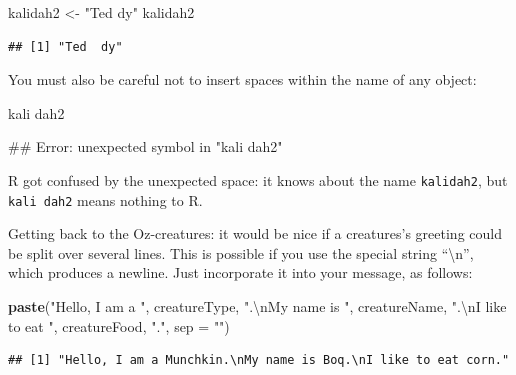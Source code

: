 \documentclass[]{book}
\makeatletter
\newenvironment{Shaded}{\begin{snugshade}}{\end{snugshade}}
\newcommand{\KeywordTok}[1]{\textcolor[rgb]{0.13,0.29,0.53}{\textbf{#1}}}
\newcommand{\DataTypeTok}[1]{\textcolor[rgb]{0.13,0.29,0.53}{#1}}
\newcommand{\CharTok}[1]{\textcolor[rgb]{0.31,0.60,0.02}{#1}}
\newcommand{\StringTok}[1]{\textcolor[rgb]{0.31,0.60,0.02}{#1}}
\newcommand{\NormalTok}[1]{#1}
\newenvironment{kframe}{%
\medskip{}
\setlength{\fboxsep}{.8em}
 \def\at@end@of@kframe{}%
 \ifinner\ifhmode%
  \def\at@end@of@kframe{\end{minipage}}%
  \begin{minipage}{\columnwidth}%
 \fi\fi%
 \def\FrameCommand##1{\hskip\@totalleftmargin \hskip-\fboxsep
 \colorbox{shadecolor}{##1}\hskip-\fboxsep
     \hskip-\linewidth \hskip-\@totalleftmargin \hskip\columnwidth}%
 \MakeFramed {\advance\hsize-\width
   \@totalleftmargin\z@ \linewidth\hsize
   \@setminipage}}%
 {\par\unskip\endMakeFramed%
 \at@end@of@kframe}
\renewenvironment{Shaded}{\begin{kframe}}{\end{kframe}}
\theoremstyle{definition}
\theoremstyle{definition}
\theoremstyle{definition}
\theoremstyle{remark}
\makeatother
\begin{document}
\begin{Shaded}
\begin{Highlighting}[]
\NormalTok{kalidah2 <-}\StringTok{ "Ted  dy"}
\NormalTok{kalidah2}
\end{Highlighting}
\end{Shaded}

\begin{verbatim}
## [1] "Ted  dy"
\end{verbatim}

You must also be careful not to insert spaces within the name of any
object:

\begin{Shaded}
\begin{Highlighting}[]
\NormalTok{kali dah2}
\end{Highlighting}
\end{Shaded}

\begin{Shaded}
\begin{Highlighting}[]
\NormalTok{## Error: unexpected symbol in "kali dah2"}
\end{Highlighting}
\end{Shaded}

R got confused by the unexpected space: it knows about the name
\texttt{kalidah2}, but \texttt{kali\ dah2} means nothing to R.

Getting back to the Oz-creatures: it would be nice if a creatures's
greeting could be split over several lines. This is possible if you use
the special string ``\textbackslash{}n'', which produces a newline. Just
incorporate it into your message, as follows:

\begin{Shaded}
\begin{Highlighting}[]
\KeywordTok{paste}\NormalTok{(}\StringTok{"Hello, I am a "}\NormalTok{,}
\NormalTok{      creatureType,}
      \StringTok{".}\CharTok{\textbackslash{}n}\StringTok{My name is "}\NormalTok{,}
\NormalTok{      creatureName,}
      \StringTok{".}\CharTok{\textbackslash{}n}\StringTok{I like to eat "}\NormalTok{,}
\NormalTok{      creatureFood,}
      \StringTok{"."}\NormalTok{,}
      \DataTypeTok{sep =} \StringTok{""}\NormalTok{)}
\end{Highlighting}
\end{Shaded}

\begin{verbatim}
## [1] "Hello, I am a Munchkin.\nMy name is Boq.\nI like to eat corn."
\end{verbatim}
\end{document}
